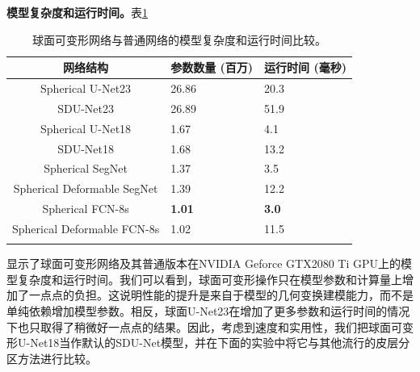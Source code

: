 \textbf{模型复杂度和运行时间。}表\ref{tab:模型复杂度和运行时间结果}
\begin{table}[h]
		\caption{\label{tab:模型复杂度和运行时间结果}球面可变形网络与普通网络的模型复杂度和运行时间比较。}
		\centering
		\begin{tabularx}{0.85\linewidth}{c X<{\centering} X<{\centering}}
			\Xhline{2\arrayrulewidth}
			网络结构 & 参数数量 (百万)           & 运行时间 (毫秒)         \\
			\hline
			Spherical U-Net23                & 26.86      &    20.3 \\
			SDU-Net23    &  	26.89           		&   51.9   \\   
			Spherical U-Net18               & 1.67                  	&	4.1	 \\
			SDU-Net18   &	1.68	                &	13.2	  \\
			Spherical SegNet                 & 	1.37                    &			3.5 \\
			Spherical Deformable SegNet    &			1.39            &  	 12.2	 \\
			Spherical FCN-8s                 &  		\textbf{1.01}                &	\textbf{3.0}	 \\
			Spherical Deformable FCN-8s   & 	1.02                    &11.5  \\
			\Xhline{2\arrayrulewidth} 
		\end{tabularx}
\end{table}
显示了球面可变形网络及其普通版本在NVIDIA Geforce GTX2080 Ti GPU上的模型复杂度和运行时间。我们可以看到，球面可变形操作只在模型参数和计算量上增加了一点点的负担。这说明性能的提升是来自于模型的几何变换建模能力，而不是单纯依赖增加模型参数。相反，球面U-Net23在增加了更多参数和运行时间的情况下也只取得了稍微好一点点的结果。因此，考虑到速度和实用性，我们把球面可变形U-Net18当作默认的SDU-Net模型，并在下面的实验中将它与其他流行的皮层分区方法进行比较。

